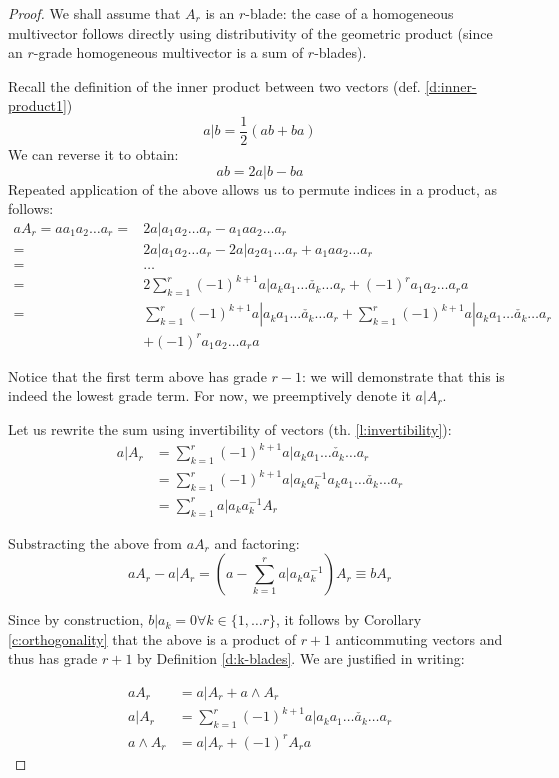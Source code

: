 \begin{proof}
	We shall assume that $A_r$ is an $r$-blade: the case of a homogeneous multivector follows directly using distributivity of the geometric product (since an $r$-grade homogeneous multivector is a sum of $r$-blades).

	Recall the definition of the inner product between two vectors (def. \ref{d:inner-product1})
	\[a | b = \frac{1}{2}(ab + ba)\]
	We can reverse it to obtain:
	\[ab = 2 a | b - ba\]
	Repeated application of the above allows us to permute indices in a product, as follows:
	\begin{align*}
		aA_r = aa_1a_2 \ldots a_r = &2a|a_1a_2 \ldots a_r - a_1aa_2 \ldots a_r \\
		= &2a|a_1a_2 \ldots a_r - 2a|a_2a_1 \ldots a_r + a_1aa_2 \ldots a_r \\
		= &\ldots \\
		= &2 \sum_{k=1}^r (-1)^{k+1}a|a_k a_1 \ldots \check{a_k} \ldots a_r + (-1)^ra_1a_2 \ldots a_ra \\
		= &\sum_{k=1}^r (-1)^{k+1}a|a_k a_1 \ldots \check{a_k} \ldots a_r + \sum_{k=1}^r (-1)^{k+1}a|a_k a_1 \ldots \check{a_k} \ldots a_r \\
		&+ (-1)^ra_1a_2 \ldots a_ra
	\end{align*}

	Notice that the first term above has grade $r-1$: we will demonstrate that this is indeed the lowest grade term. For now, we preemptively denote it $a | A_r$.
	
	Let us rewrite the sum using invertibility of vectors (th. \ref{l:invertibility}):
	\begin{align*}
		a | A_r &= \sum_{k=1}^r (-1)^{k+1}a|a_k a_1 \ldots \check{a_k} \ldots a_r\\
				&= \sum_{k=1}^r (-1)^{k+1}a|a_k a_k^{-1}a_k a_1 \ldots \check{a_k} \ldots a_r\\
				&= \sum_{k=1}^r a|a_k a_k^{-1} A_r 
	\end{align*}

	Substracting the above from $aA_r$ and factoring:
	\[aA_r - a | A_r = (a - \sum_{k=1}^r a|a_k a_k^{-1})A_r \equiv bA_r\]
	
	Since by construction, $b | a_k = 0 \forall k \in \{1, \ldots r\}$, it follows by Corollary \ref{c:orthogonality} that the above is a product of $r+1$ anticommuting vectors and thus has grade $r+1$ by Definition \ref{d:k-blades}. We are justified in writing:

	\begin{align*}
		aA_r &= a | A_r + a \wedge A_r \\
		a | A_r &= \sum_{k=1}^r (-1)^{k+1}a|a_k a_1 \ldots \check{a_k} \ldots a_r \\
		a \wedge A_r &= a | A_r + (-1)^rA_ra
	\end{align*}


\end{proof}
